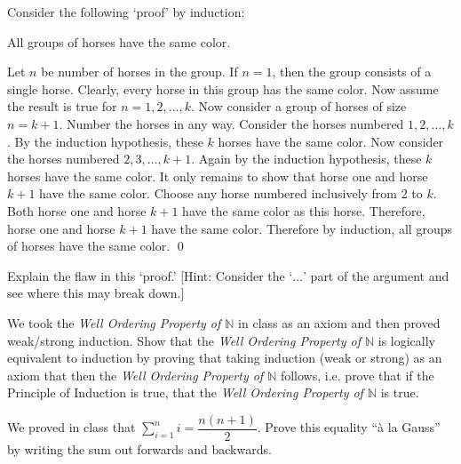 \documentclass[11pt,letterpaper]{article}
\begin{document}
\homework{}

 Consider the following `proof' by induction: \pspace

\begin{prop}
All groups of horses have the same color.
\end{prop}

\pf Let $n$ be number of horses in the group. If $n= 1$, then the group consists of a single horse. Clearly, every horse in this group has the same color. Now assume the result is true for $n= 1, 2, \ldots, k$. Now consider a group of horses of size $n= k + 1$. Number the horses in any way. Consider the horses numbered $1, 2, \ldots, k$. By the induction hypothesis, these $k$ horses have the same color. Now consider the horses numbered $2, 3, \ldots, k + 1$.  Again by the induction hypothesis, these $k$ horses have the same color. It only remains to show that horse one and horse $k + 1$ have the same color. Choose any horse numbered inclusively from 2 to $k$. Both horse one and horse $k + 1$ have the same color as this horse. Therefore, horse one and horse $k + 1$ have the same color. Therefore by induction, all groups of horses have the same color. \qed \pspace

Explain the flaw in this `proof.' [Hint: Consider the `$\ldots$' part of the argument and see where this may break down.] 





\newpage





 We took the \textit{Well Ordering Property of $\mathbb{N}$} in class as an axiom and then proved weak/strong induction. Show that the \textit{Well Ordering Property of $\mathbb{N}$} is logically equivalent to induction by proving that taking induction (weak or strong) as an axiom that then the \textit{Well Ordering Property of $\mathbb{N}$} follows, i.e. prove that if the Principle of Induction is true, that the \textit{Well Ordering Property of $\mathbb{N}$} is true. 





\newpage





 We proved in class that $\displaystyle \sum_{i=1}^n i= \dfrac{n(n + 1)}{2}$. Prove this equality ``\`a la Gauss'' by writing the sum out forwards and backwards. 
\end{document}
